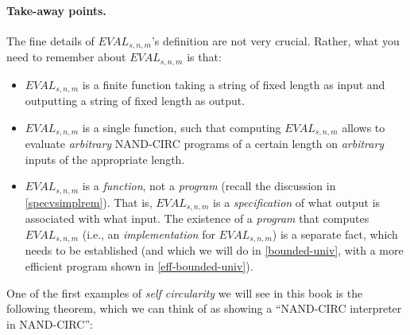 \paragraph{Take-away points.} The fine details of
\(\ensuremath{\mathit{EVAL}}_{s,n,m}\)'s definition are not very
crucial. Rather, what you need to remember about
\(\ensuremath{\mathit{EVAL}}_{s,n,m}\) is that:

\begin{itemize}
\item
  \(\ensuremath{\mathit{EVAL}}_{s,n,m}\) is a finite function taking a
  string of fixed length as input and outputting a string of fixed
  length as output.
\item
  \(\ensuremath{\mathit{EVAL}}_{s,n,m}\) is a single function, such that
  computing \(\ensuremath{\mathit{EVAL}}_{s,n,m}\) allows to evaluate
  \emph{arbitrary} NAND-CIRC programs of a certain length on
  \emph{arbitrary} inputs of the appropriate length.
\item
  \(\ensuremath{\mathit{EVAL}}_{s,n,m}\) is a \emph{function}, not a
  \emph{program} (recall the discussion in \cref{specvsimplrem}). That
  is, \(\ensuremath{\mathit{EVAL}}_{s,n,m}\) is a \emph{specification}
  of what output is associated with what input. The existence of a
  \emph{program} that computes \(\ensuremath{\mathit{EVAL}}_{s,n,m}\)
  (i.e., an \emph{implementation} for
  \(\ensuremath{\mathit{EVAL}}_{s,n,m}\)) is a separate fact, which
  needs to be established (and which we will do in \cref{bounded-univ},
  with a more efficient program shown in \cref{eff-bounded-univ}).
\end{itemize}

One of the first examples of \emph{self circularity} we will see in this
book is the following theorem, which we can think of as showing a
``NAND-CIRC interpreter in NAND-CIRC'':

\hypertarget{bounded-univ}{}

